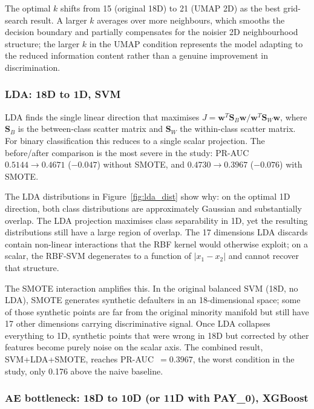 \documentclass[12pt,a4paper]{article}
\begin{document}
The optimal $k$ shifts from 15 (original 18D) to 21 (UMAP 2D) as the
best grid-search result. A larger $k$ averages over more neighbours, which
smooths the decision boundary and partially compensates for the noisier
2D neighbourhood structure; the larger $k$ in the UMAP condition represents
the model adapting to the reduced information content rather than a genuine
improvement in discrimination.

\subsubsection*{LDA: 18D to 1D, SVM}

LDA finds the single linear direction that maximises
$J = \mathbf{w}^T \mathbf{S}_B \mathbf{w} / \mathbf{w}^T \mathbf{S}_W \mathbf{w}$,
where $\mathbf{S}_B$ is the between-class scatter matrix and $\mathbf{S}_W$
the within-class scatter matrix. For binary classification this reduces to a
single scalar projection. The before/after comparison is the most severe in
the study: PR-AUC $0.5144 \to 0.4671$ ($-0.047$) without SMOTE, and
$0.4730 \to 0.3967$ ($-0.076$) with SMOTE.

The LDA distributions in Figure~\ref{fig:lda_dist} show why: on the
optimal 1D direction, both class distributions are approximately Gaussian and
substantially overlap. The LDA projection maximises class separability in 1D,
yet the resulting distributions still have a large region of overlap. The 17
dimensions LDA discards contain non-linear interactions that the RBF kernel
would otherwise exploit; on a scalar, the RBF-SVM degenerates to a function
of $|x_1 - x_2|$ and cannot recover that structure.

The SMOTE interaction amplifies this. In the original balanced SVM (18D, no
LDA), SMOTE generates synthetic defaulters in an 18-dimensional space; some
of those synthetic points are far from the original minority manifold but still
have 17 other dimensions carrying discriminative signal. Once LDA collapses
everything to 1D, synthetic points that were wrong in 18D but corrected by
other features become purely noise on the scalar axis. The combined result,
SVM+LDA+SMOTE, reaches PR-AUC~$= 0.3967$, the worst condition in the study,
only 0.176 above the naive baseline.

\subsubsection*{AE bottleneck: 18D to 10D (or 11D with PAY\_0), XGBoost}
\end{document}
